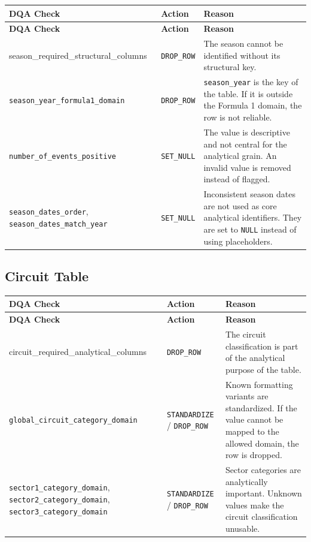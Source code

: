 \documentclass[a4paper,11pt]{article}
\begin{document}
	\begin{longtable}{p{6cm}p{2.5cm}p{6.4cm}}
		\toprule
		\textbf{DQA Check} & \textbf{Action} & \textbf{Reason} \\
		\midrule
		\endfirsthead
		
		\toprule
		\textbf{DQA Check} & \textbf{Action} & \textbf{Reason} \\
		\midrule
		\endhead
		
		season\_required\_structural\_columns
		& \texttt{DROP\_ROW}
		& The season cannot be identified without its structural key. \\
		\midrule
		
		\texttt{season\_year\_formula1\_domain}
		& \texttt{DROP\_ROW}
		& \texttt{season\_year} is the key of the table. If it is outside the Formula 1 domain, the row is not reliable. \\
		\midrule
		
		\texttt{number\_of\_events\_positive}
		& \texttt{SET\_NULL}
		& The value is descriptive and not central for the analytical grain. An invalid value is removed instead of flagged. \\
		\midrule
		
		\texttt{season\_dates\_order}, \texttt{season\_dates\_match\_year}
		& \texttt{SET\_NULL}
		& Inconsistent season dates are not used as core analytical identifiers. They are set to \texttt{NULL} instead of using placeholders. \\
		\bottomrule
	\end{longtable}
	
	\subsection{Circuit Table}
	
	\begin{longtable}{p{6cm}p{2.5cm}p{6.4cm}}
		\toprule
		\textbf{DQA Check} & \textbf{Action} & \textbf{Reason} \\
		\midrule
		\endfirsthead
		
		\toprule
		\textbf{DQA Check} & \textbf{Action} & \textbf{Reason} \\
		\midrule
		\endhead
		
		circuit\_required\_analytical\_columns
		& \texttt{DROP\_ROW}
		& The circuit classification is part of the analytical purpose of the table. \\
		\midrule
		
		\texttt{global\_circuit\_category\_domain}
		& \texttt{STANDARDIZE} / \texttt{DROP\_ROW}
		& Known formatting variants are standardized. If the value cannot be mapped to the allowed domain, the row is dropped. \\
		\midrule
		
		\texttt{sector1\_category\_domain}, \texttt{sector2\_category\_domain}, \texttt{sector3\_category\_domain}
		& \texttt{STANDARDIZE} / \texttt{DROP\_ROW}
		& Sector categories are analytically important. Unknown values make the circuit classification unusable. \\
		\bottomrule
	\end{longtable}
	
\end{document}
